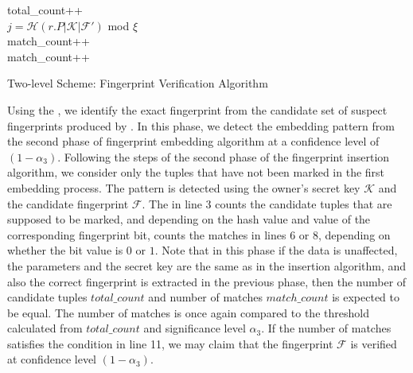 \begin{algorithm}
    {
        {
        total\_count++\\
        $j=\mathcal{H}(r.P|\mathcal{K}|\mathcal{F}')$ mod $\xi$\\
        {
            match\_count++\\
        }
        {
        match\_count++\\
        }
        }
    }
    {
    }
    \caption{Two-level Scheme: Fingerprint Verification Algorithm}
    \label{alg:two-level-verification}
\end{algorithm}

Using the , we identify the exact fingerprint from the candidate set of suspect fingerprints produced by . 
In this phase, we detect the embedding pattern from the second phase of fingerprint embedding algorithm at a confidence level of $(1-\alpha_3)$.
Following the steps of the second phase of the fingerprint insertion algorithm, we consider only the tuples that have not been marked in the first embedding process. 
The pattern is detected using the owner's secret key $\mathcal{K}$ and the candidate fingerprint $\mathcal{F}$.
The  in line 3 counts the candidate tuples that are supposed to be marked, and depending on the hash value and value of the corresponding fingerprint bit, counts the matches in lines 6 or 8, depending on whether the bit value is $0$ or $1$. 
Note that in this phase if the data is unaffected, the parameters and the secret key are the same as in the insertion algorithm, and also the correct fingerprint is extracted in the previous phase, then the number of candidate tuples $total\_count$ and number of matches $match\_count$ is expected to be equal.
The number of matches is once again compared to the threshold calculated from $total\_count$ and significance level $\alpha_3$. 
If the number of matches satisfies the condition in line 11, we may claim that the fingerprint $\mathcal{F}$ is verified at confidence level $(1-\alpha_3)$.

